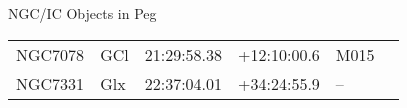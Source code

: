 \begin{block}{NGC/IC Objects in Peg}
  \centering
  \begin{tabularx}{\textwidth}{llrrll} \toprule 
    NGC7078 & GCl & 21:29:58.38 & +12:10:00.6  & M015 \\ 
    NGC7331 & Glx & 22:37:04.01 & +34:24:55.9  & -- \\ 
  \end{tabularx}
\end{block}